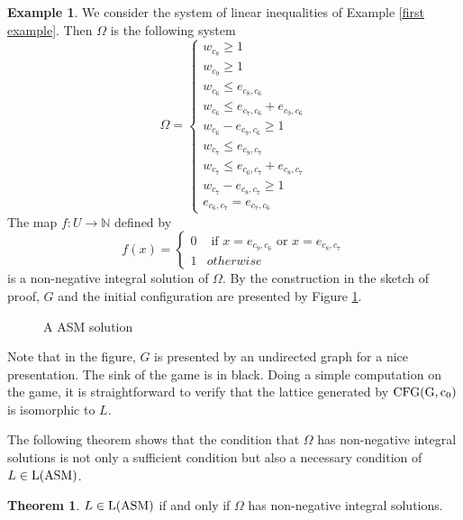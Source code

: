 \documentclass{article}
\theoremstyle{definition}
\newtheorem{examp}{Example}
\newtheorem{theo}{Theorem}
\newcommand\downn[2]{e_{#1,#2}}
\newcommand\downnn[2]{{#1}_{#2}}
\begin{document}
\begin{examp}
\label{second example ?}
We consider the system of linear inequalities of Example \ref{first example}. Then $\Omega$ is the following system
$$
\Omega=\left\{\begin{array}{l}
\downnn{w}{c_8}\geq 1\\
\downnn{w}{c_9}\geq 1\\
\downnn{w}{c_6}\leq \downn{c_8}{c_6}\\
\downnn{w}{c_6}\leq \downn{c_7}{c_6}+\downn{c_9}{c_6}\\
\downnn{w}{c_6}-\downn{c_9}{c_6}\geq 1\\
\downnn{w}{c_7}\leq \downn{c_9}{c_7}\\
\downnn{w}{c_7}\leq \downn{c_6}{c_7}+\downn{c_8}{c_7}\\
\downnn{w}{c_7}-\downn{c_8}{c_7}\geq 1\\
\downn{c_6}{c_7}=\downn{c_7}{c_6}
\end{array}\right.
$$
The map $f:U\to \mathbb{N}$ defined by 
$$
f(x)=\begin{cases}
0& \text{ if } x=\downn{c_9}{c_6} \text{ or } x=\downn{c_8}{c_7}\\
1& otherwise
\end{cases}
$$
is a non-negative integral solution of $\Omega$. By the construction in the sketch of proof, $G$ and the initial configuration are presented by Figure \ref{fig:image2526}.
\begin{figure}[h]
\centering
{}
\qquad \qquad
{}
\caption{A ASM solution}
\label{fig:image2526}
\end{figure}
Note that in the figure, $G$ is presented by an undirected graph for a nice presentation. The sink of the game is in black. Doing a simple computation on the game, it is straightforward to verify that the lattice generated by ${\rm CFG(G,c_0)}$ is isomorphic to $L$. 

The following theorem shows that the condition that $\Omega$ has non-negative integral solutions is not only a sufficient condition but also a necessary condition of $L \in {\rm L(ASM)}$. 
\end{examp}
\begin{theo}
\label{necessary and sufficient condition for ASM}
$L\in {\rm L(ASM)}$ if and only if $\Omega$ has non-negative integral solutions.
\end{theo}
\end{document}
